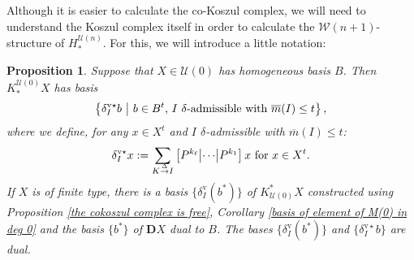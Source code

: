 \documentclass[11pt]{amsart} \renewcommand{\baselinestretch}{1.2}
\theoremstyle{plain}
\newtheorem{prop}[thm]{Proposition}
\numberwithin{equation}{section} %
\theoremstyle{plain}
\newtheorem{prop}[thm]{Proposition}
\numberwithin{equation}{chapter} %
\newcommand{\calU}{\mathcal{U}}
\newcommand{\calw}{\mathcal{W}}
\newcommand{\deltaalg}{\Delta} %
\newcommand{\minDimP}{\overline{m}}
\newcommand{\produces}[3]{#3:#1\sim #2}
\renewcommand{\produces}[3]{#1\rightarrow_{#3} #2}%
\renewcommand{\produces}[3]{#1\overset{\smash{#3}}{\rightarrow} #2}%
\newcommand{\uver}{^\mathrm{v}}
\newcommand{\deltav}{\delta\uver}
\newcommand{\deltavstar}{\delta^{\mathrm{v}\star}}
\newcommand{\dual}{\mathbf{D}}
\newcommand{\SubsectionOrSection}[1]{\subsection{#1}}
\begin{document}
\begin{Koszul complexes}
Although it is easier to calculate the co-Koszul complex, we will need to understand the Koszul complex itself in order to calculate the $\calw(n+1)$-structure of $H_*^{\calU(n)}$. For this, we will introduce a little notation:
\begin{prop}
\label{propDerivedIndTrivialUobject n=0}
Suppose that $X\in\calU(0)$ has homogeneous basis $B$. Then $K_*^{\calU(0)}X$ has basis
\[\left\{\deltavstar_Ib\ \middle|\ b\in B^t\textup{, $I$ $\delta$-admissible with }\minDimP(I)\leq t\right\},\]
where we define, for any $x \in X^t$ and $I$ $\delta$-admissible with $\minDimP(I)\leq t$:
\[\deltavstar_Ix:=
\sum_{\produces{K}{I}{\deltaalg}}\left[P^{k_\ell} \middle|\cdots\middle|P^{k_1} \right]x\textup{ for $x\in X^t$}.\]
%
If $X$ is of finite type, there is a basis $\{\deltav_I(b^*)\}$ of $K^*_{\calU(0)}X$ constructed using Proposition \ref{the cokoszul complex is free}, Corollary \ref{basis of element of M(0) in deg 0} and the basis $\{b^*\}$ of $\dual X$ dual to $B$. The bases $\{\deltav_I(b^*)\}$ and $\{\deltavstar_Ib\}$ are dual.


\end{prop}
\end{Koszul complexes}
\end{document}
